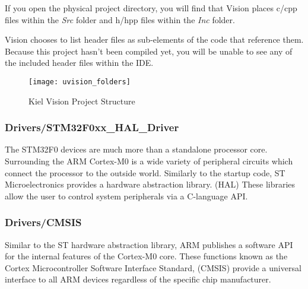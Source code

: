 \documentclass[11pt,fleqn]{book} %
\begin{document}
If you open the physical project directory, you will find that {\textmu}Vision places c/cpp files within the \textit{Src} folder and h/hpp files within the \textit{Inc} folder. 
 
\begin{warning}
	{\textmu}Vision chooses to list header files as sub-elements of the code that reference them. Because this project hasn't been compiled yet, you will be unable to see any of the included header files within the IDE.
\end{warning}

\begin{figure}[h!]
	\centering\texttt{[image: uvision\_folders]}
	\caption{Kiel {\textmu}Vision Project Structure}
	\label{uvision_folders}
\end{figure}

\subsubsection*{Drivers/STM32F0xx\_HAL\_Driver}
The STM32F0 devices are much more than a standalone processor core. Surrounding the ARM Cortex-M0 is a wide variety of peripheral circuits which connect the processor to the outside world. Similarly to the startup code, ST Microelectronics provides a hardware abstraction library. (HAL) These libraries allow the user to control system peripherals via a C-language API. %

\subsubsection*{Drivers/CMSIS}
Similar to the ST hardware abstraction library, ARM publishes a software API for the internal features of the Cortex-M0 core. These functions known as the Cortex Microcontroller Software Interface Standard, (CMSIS) provide a universal interface to all ARM devices regardless of the specific chip manufacturer. 
\end{document}
